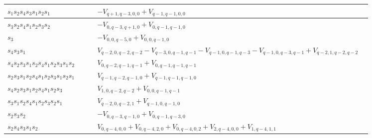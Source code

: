 \documentclass{amsart}
\theoremstyle{definition}
\begin{document}
\begin{table}
\begin{tabular}{|p{0.24\linewidth}|p{0.61\linewidth}|}
$s_1s_2s_4s_3s_1s_2s_1$ & $-V_{q+1,q-3,0,0} + V_{q-1,q-1,0,0}$ \\ \hline
$s_3s_2s_4s_1s_2s_3s_2$ & $-V_{0,q-3,q+1,0} + V_{0,q-1,q-1,0}$ \\ \hline
$s_3$ & $-V_{0,0,q-5,0} + V_{0,0,q-1,0}$ \\ \hline
$s_4s_3s_1$ & $V_{q-2,0,q-2,q-2} - V_{q-3,0,q-1,q-1} - V_{q-1,0,q-1,q-3} - V_{q-1,0,q-3,q-1} + V_{q-2,1,q-2,q-2}$ \\ \hline
$s_4s_2s_3s_1s_2s_4s_1s_2s_3s_1s_2$ & $V_{0,q-2,q-1,q-1} + V_{0,q-1,q-1,q-1}$ \\ \hline
$s_2s_3s_1s_2s_4s_1s_2s_3s_1s_2s_1$ & $V_{q-1,q-2,q-1,0} + V_{q-1,q-1,q-1,0}$ \\ \hline
$s_4s_2s_3s_1s_2s_4s_1s_2s_3$ & $V_{1,0,q-2,q-2} + V_{0,0,q-1,q-1}$ \\ \hline
$s_3s_1s_2s_4s_1s_2s_3s_2s_1$ & $V_{q-2,0,q-2,1} + V_{q-1,0,q-1,0}$ \\ \hline
$s_2s_3s_2$ & $-V_{0,q-3,q-1,0} + V_{0,q-1,q-3,0}$ \\ \hline
$s_2s_4s_3s_1s_2$ & $V_{0,q-4,0,0} + V_{0,q-4,2,0} + V_{0,q-4,0,2} + V_{2,q-4,0,0} + V_{1,q-4,1,1}$ \\
\hline
\end{tabular}
\end{table}
\fi
\clearpage

\printbibliography
\end{document}

